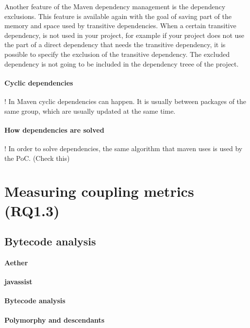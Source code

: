 Another feature of the Maven dependency management is the dependency exclusions. This feature is available again with the goal of saving part of the memory and space used by transitive dependencies. When a certain transitive dependency, is not used in your project, for example if your project does not use the part of a direct dependency that needs the transitive dependency, it is possible to specify the exclusion of the transitive dependency. The excluded dependency is not going to be included in the dependency treee of the project.

\paragraph{Cyclic dependencies}
! In Maven cyclic dependencies can happen. It is usually between packages of the same group, which are usually updated at the same time.

\paragraph{How dependencies are solved}
! In order to solve dependencies, the same algorithm that maven uses is used by the PoC. (Check this)

\section{Measuring coupling metrics (RQ1.3)}

\subsection{Bytecode analysis}

\paragraph{Aether}

\paragraph{javassist}

\paragraph{Bytecode analysis}

\paragraph{Polymorphy and descendants}


